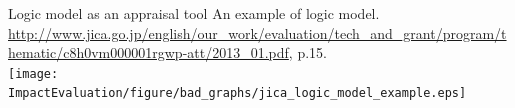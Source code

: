 % 
% 	
% 
% 

\begin{frame}{Logic model as an appraisal tool}
An example of logic model. \hfill{\scriptsize\url{http://www.jica.go.jp/english/our_work/evaluation/tech_and_grant/program/thematic/c8h0vm000001rgwp-att/2013_01.pdf}, p.15.}\\
\hfil\texttt{[image: ImpactEvaluation/figure/bad\_graphs/jica\_logic\_model\_example.eps]}
\end{frame}


